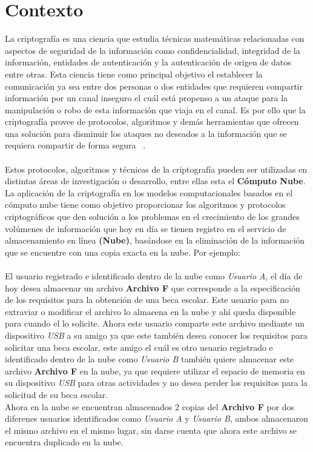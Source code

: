 
\section{Contexto}

La criptografía es una ciencia que estudia técnicas matemáticas relacionadas con aspectos de seguridad de la información como confidencialidad, integridad de la información, entidades de autenticación y la autenticación de origen de datos entre otras. Esta ciencia tiene como principal objetivo el establecer la comunicación ya sea entre dos personas o dos entidades que requieren compartir información por un canal inseguro el cuál está propenso a un ataque para la manipulación o robo de esta información que viaja en el canal. Es por ello que la criptografía provee de protocolos, algoritmos y demás herramientas que ofrecen una solución para disminuir los ataques no deseados a la información que se requiera compartir de forma segura ~\cite{menezes}.
\\ \\
Estos protocolos, algoritmos y técnicas de la criptografía pueden ser utilizadas en distintas áreas de investigación o desarrollo, entre ellas esta el \textbf{Cómputo Nube}. La aplicación de la criptografía en los modelos computacionales basados en el cómputo nube tiene como objetivo proporcionar los algoritmos y protocolos criptográficos que den solución a los problemas en el crecimiento de los grandes volúmenes de información que hoy en día se tienen registro en el servicio de almacenamiento en línea \textbf{(Nube)}, basándose en la eliminación de la información que se encuentre con una copia exacta en la nube. Por ejemplo: 
\\ \\
El usuario registrado e identificado dentro de la nube como \textit{Usuario A}, el día de hoy desea almacenar un archivo \textbf{Archivo F} que corresponde a la especificación de los requisitos para la obtención de una beca escolar. Este usuario para no extraviar o modificar el archivo lo almacena en la nube y ahí queda disponible para cuando el lo solicite. Ahora este usuario comparte este archivo mediante un dispositivo \textit{USB} a su amigo ya que este también desea conocer los requisitos para solicitar una beca escolar, este amigo el cuál es otro usuario registrado e identificado dentro de la nube como \textit{Usuario B} también quiere almacenar este archivo \textbf{Archivo F} en la nube, ya que requiere utilizar el espacio de memoria en su dispositivo \textit{USB} para otras actividades y no desea perder los requisitos para la solicitud de su beca escolar. \\
Ahora en la nube se encuentran almacenados 2 copias del \textbf{Archivo F} por dos diferenes usuarios identificados como  \textit{Usuario A} y \textit{Usuario B}, ambos almacenaron el mismo archivo en el mismo lugar, sin darse cuenta que ahora este archivo se encuentra duplicado en la nube. 



